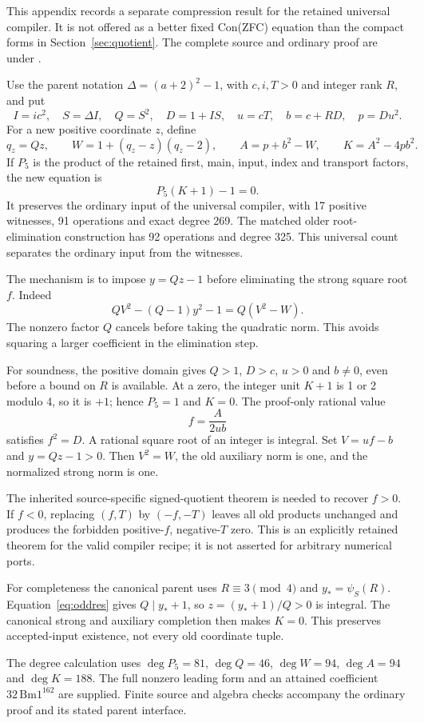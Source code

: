 This appendix records a separate compression result for the retained
universal compiler. It is not offered as a better fixed Con(ZFC)
equation than the compact forms in Section~\ref{sec:quotient}.
The complete source and ordinary proof are under
.

Use the parent notation $\Delta=(a+2)^2-1$, with $c,i,T>0$ and
integer rank $R$, and put
\[
 I=ic^2,\quad S=\Delta I,\quad Q=S^2,\quad D=1+IS,
 \quad u=cT,\quad b=c+RD,\quad p=Du^2.
\]
For a new positive coordinate $z$, define
\[
 q_z=Qz,\qquad W=1+(q_z-z)(q_z-2),\qquad
 A=p+b^2-W,\qquad K=A^2-4pb^2.
\]
If $P_5$ is the product of the retained first, main, input, index and
transport factors, the new equation is
\[
 P_5(K+1)-1=0.
\]
It preserves the ordinary input of the universal compiler, with 17
positive witnesses, 91 operations and exact degree 269. The matched
older root-elimination construction has 92 operations and degree 325.
This universal count separates the ordinary input from the witnesses.

The mechanism is to impose $y=Qz-1$ before eliminating the strong
square root $f$. Indeed
\[
 QV^2-(Q-1)y^2-1=Q(V^2-W).
\]
The nonzero factor $Q$ cancels before taking the quadratic norm.
This avoids squaring a larger coefficient in the elimination step.

For soundness, the positive domain gives $Q>1$, $D>c$, $u>0$ and
$b\ne0$, even before a bound on $R$ is available. At a zero, the
integer unit $K+1$ is 1 or 2 modulo 4, so it is $+1$; hence
$P_5=1$ and $K=0$. The proof-only rational value
\[
 f=\frac{A}{2ub}
\]
satisfies $f^2=D$. A rational square root of an integer is integral.
Set $V=uf-b$ and $y=Qz-1>0$. Then $V^2=W$, the old auxiliary norm
is one, and the normalized strong norm is one.

The inherited source-specific signed-quotient theorem is needed to
recover $f>0$. If $f<0$, replacing $(f,T)$ by $(-f,-T)$ leaves all
old products unchanged and produces the forbidden positive-$f$,
negative-$T$ zero. This is an explicitly retained theorem for the valid
compiler recipe; it is not asserted for arbitrary numerical ports.

For completeness the canonical parent uses $R\equiv3\pmod4$ and
$y_* =\psi_S(R)$. Equation~\eqref{eq:oddres} gives $Q\mid y_*+1$,
so $z=(y_*+1)/Q>0$ is integral. The canonical strong and auxiliary
completion then makes $K=0$. This preserves accepted-input existence,
not every old coordinate tuple.

The degree calculation uses $\deg P_5=81$, $\deg Q=46$,
$\deg W=94$, $\deg A=94$ and $\deg K=188$.
The full nonzero leading form and an attained coefficient
$32\,\mathrm{Bm1}^{162}$ are supplied. Finite source and algebra
checks accompany the ordinary proof and its stated parent interface.
